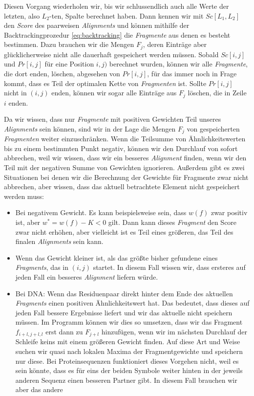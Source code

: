 Diesen Vorgang wiederholen wir, bis wir schlussendlich auch alle Werte der letzten, also $L_2$-ten, Spalte berechnet haben. Dann kennen wir mit $Sc[L_1,L_2]$ den \emph{Score} des paarweisen \emph{Alignments} und können mithilfe der Backtrackingprozedur \ref{eq:backtracking} die \emph{Fragmente} aus denen es besteht bestimmen. Dazu brauchen wir die Mengen $F_j$, deren Einträge aber glücklicherweise nicht alle dauerhaft gespeichert werden müssen. Sobald $Sc[i,j]$ und $Pr[i,j]$ für eine Position $i,j)$ berechnet wurden, können wir alle \emph{Fragmente}, die dort enden, löschen, abgesehen von $Pr[i,j]$, für das immer noch in Frage kommt, dass es Teil der optimalen Kette von \emph{Fragmenten} ist. Sollte $Pr[i,j]$ nicht in $(i,j)$ enden, können wir sogar alle Einträge aus $F_j$ löschen, die in Zeile $i$ enden.

Da wir wissen, dass nur \emph{Fragmente} mit positiven Gewichten Teil unseres \emph{Alignments} sein können, sind wir in der Lage die Mengen $F_j$ von gespeicherten \emph{Fragmenten} weiter einzuschränken. Wenn die Teilsumme von Ähnlichkeitswerten bis zu einem bestimmten Punkt negativ, können wir den Durchlauf von  sofort abbrechen, weil wir wissen, dass wir ein besseres \emph{Alignment} finden, wenn wir den Teil mit der negativen Summe von Gewichten ignorieren. Außerdem gibt es zwei Situationen bei denen wir die Berechnung der Gewichte für Fragmente zwar nicht abbrechen, aber wissen, dass das aktuell betrachtete Element nicht gespeichert werden muss:

\begin{itemize}
	\item Bei negativem Gewicht. Es kann beispielsweise sein, dass $w(f)$ zwar positiv ist, aber $w^* = w(f)-K < 0$ gilt. Dann kann dieses \emph{Fragment} den Score zwar nicht erhöhen, aber vielleicht ist es Teil eines größeren, das Teil des finalen \emph{Alignments} sein kann.
	\item Wenn das Gewicht kleiner ist, als das größte bisher gefundene eines \emph{Fragments}, das in $(i,j)$ startet. In diesem Fall wissen wir, dass ersteres auf jeden Fall ein besseres \emph{Alignment} liefern würde.
	\item Bei DNA: Wenn das Residuenpaar direkt hinter dem Ende des aktuellen \emph{Fragments} einen positiven Ähnlichkeitswert hat. Das bedeutet, dass dieses auf jeden Fall bessere Ergebnisse liefert und wir das aktuelle nicht speichern müssen. Im Programm können wir dies so umsetzen, dass wir das Fragment $f_{i+l,j+l,l}$ erst dann zu $F_{j+l}$ hinzufügen, wenn wir im nächsten Durchlauf der Schleife  keins mit einem größeren Gewicht finden. Auf diese Art und Weise suchen wir quasi nach lokalen Maxima der Fragmentgewichte und speichern nur diese. Bei Proteinsequenzen funktioniert dieses Vorgehen nicht, weil es sein könnte, dass es für eins der beiden Symbole weiter hinten in der jeweils anderen Sequenz einen besseren Partner gibt. In diesem Fall brauchen wir aber das andere 
\end{itemize}

